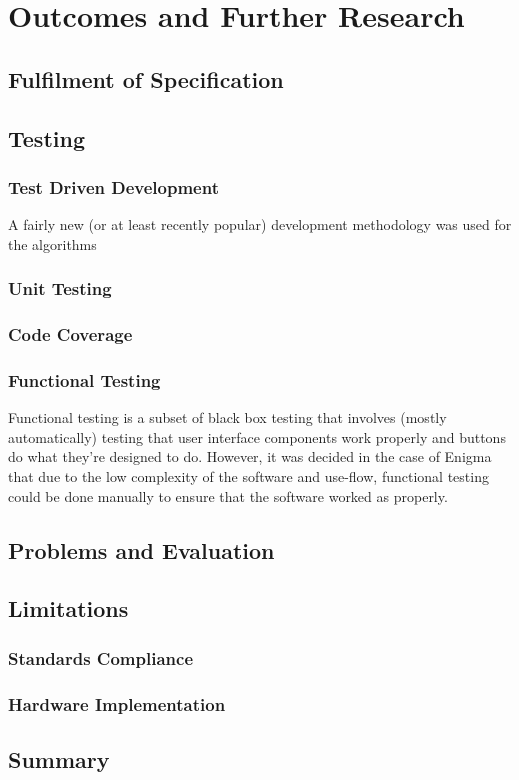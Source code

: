 
\chapter{Outcomes and Further Research} 
\label{Chapter8}

\section{Fulfilment of Specification}



\section{Testing}



\subsection{Test Driven Development}

A fairly new (or at least recently popular) development methodology was used for the algorithms 

\subsection{Unit Testing}



\subsection{Code Coverage}



\subsection{Functional Testing}

Functional testing is a subset of black box testing that involves (mostly automatically) testing that user interface components work properly and buttons do what they're designed to do. However, it was decided in the case of Enigma that due to the low complexity of the software and use-flow, functional testing could be done manually to ensure that the software worked as properly.

\section{Problems and Evaluation}
\label{sec:probs}

\section{Limitations}

\subsection{Standards Compliance}

\subsection{Hardware Implementation}

\section{Summary}

